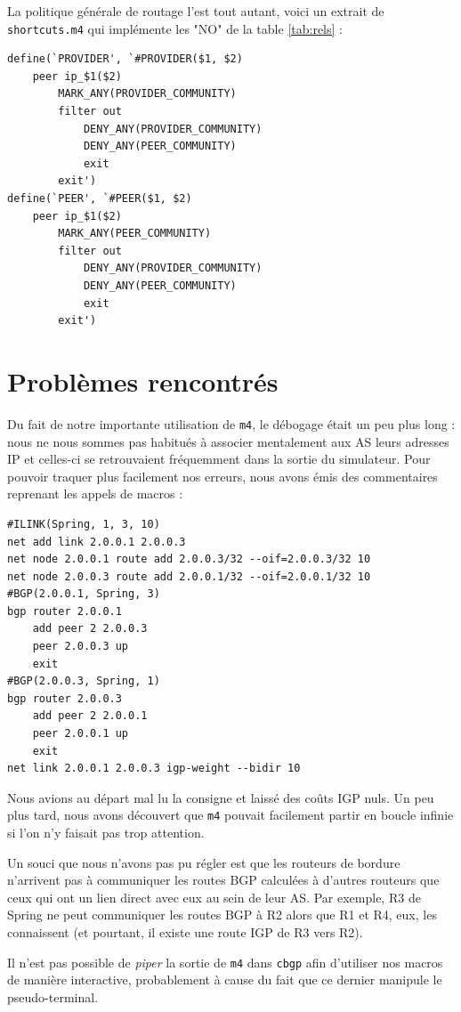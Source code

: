 \documentclass[10pt,a4paper,twocolumn]{article}
\begin{document}
La politique générale de routage l'est tout autant, voici un extrait de \texttt{shortcuts.m4} qui implémente les "NO" de la table \ref{tab:rels} :
\begin{verbatim}
define(`PROVIDER', `#PROVIDER($1, $2)
    peer ip_$1($2)
        MARK_ANY(PROVIDER_COMMUNITY)
        filter out
            DENY_ANY(PROVIDER_COMMUNITY)
            DENY_ANY(PEER_COMMUNITY)
            exit
        exit')
define(`PEER', `#PEER($1, $2)
    peer ip_$1($2)
        MARK_ANY(PEER_COMMUNITY)
        filter out
            DENY_ANY(PROVIDER_COMMUNITY)
            DENY_ANY(PEER_COMMUNITY)
            exit
        exit')
\end{verbatim}

\section{Problèmes rencontrés}
Du fait de notre importante utilisation de \texttt{m4}, le débogage était un peu plus long : nous ne nous sommes pas habitués à associer mentalement aux AS leurs adresses IP et celles-ci se retrouvaient fréquemment dans la sortie du simulateur. Pour pouvoir traquer plus facilement nos erreurs, nous avons émis des commentaires reprenant les appels de macros :
\begin{verbatim}
#ILINK(Spring, 1, 3, 10)
net add link 2.0.0.1 2.0.0.3
net node 2.0.0.1 route add 2.0.0.3/32 --oif=2.0.0.3/32 10
net node 2.0.0.3 route add 2.0.0.1/32 --oif=2.0.0.1/32 10
#BGP(2.0.0.1, Spring, 3)
bgp router 2.0.0.1
    add peer 2 2.0.0.3
    peer 2.0.0.3 up
    exit
#BGP(2.0.0.3, Spring, 1)
bgp router 2.0.0.3
    add peer 2 2.0.0.1
    peer 2.0.0.1 up
    exit
net link 2.0.0.1 2.0.0.3 igp-weight --bidir 10
\end{verbatim}

Nous avions au départ mal lu la consigne et laissé des coûts IGP nuls. Un peu plus tard, nous avons découvert que \texttt{m4} pouvait facilement partir en boucle infinie si l'on n'y faisait pas trop attention.

Un souci que nous n'avons pas pu régler est que les routeurs de bordure n'arrivent pas à communiquer les routes BGP calculées à d'autres routeurs que ceux qui ont un lien direct avec eux au sein de leur AS.
Par exemple, R3 de Spring ne peut communiquer les routes BGP à R2 alors que R1 et R4, eux, les connaissent (et pourtant, il existe une route IGP de R3 vers R2).

Il n'est pas possible de \textit{piper} la sortie de \texttt{m4} dans \texttt{cbgp} afin d'utiliser nos macros de manière interactive, probablement à cause du fait que ce dernier manipule le pseudo-terminal.
\end{document}
